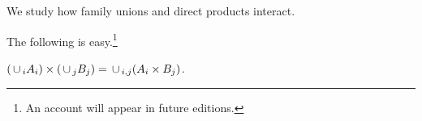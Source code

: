 


We study how family unions and direct products interact.


The following is easy.\footnote{An account will appear in future editions.}

\begin{proposition}
  $(\,\cup\,_{i} A_i) \times (\,\cup\,_j B_j) = \,\cup\,_{i, j} (A_i \times B_j)$.
\end{proposition}

\blankpage

